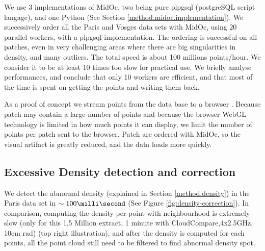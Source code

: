 		
		We use 3 implementations of MidOc, two being pure plpgsql (postgreSQL script langage), and one Python (See Section \ref{method.midoc.implementation}).
		We successively order all the Paris and Vosges data sets with MidOc, using 20 parallel workers, with a plpgsql implementation.
		The ordering is successful on all patches, even in very challenging areas where there are big singularities in density, and many outliers.
		The total speed is about 100 millions points/hour.
		We consider it to be at least 10 times too slow for practical use.
		We briefly analyse performances, and conclude that only 10 workers are efficient, and that most of the time is spent on getting the points and writing them back.
		
		 
		As a proof of concept we stream points from the data base to a browser \cite{IGN2014a}. Because patch may contain a large number of points and because the browser WebGL technology is limited in how much points it can display,
		we limit the number of points per patch sent to the browser. Patch are ordered with MidOc, so the visual artifact is greatly reduced, and the data loads more quickly. 


	\subsection{Excessive Density detection and correction} 
		
		We detect the abnormal density (explained in Section \ref{method.density}) in the Paris data set in $\sim 100 \milli \second$ 
		(See Figure \ref{fig:density-correction}). 
		In comparison, computing the density per point with neighbourhood is extremely slow (only for this 1.5 Million extract, 1 minute with CloudCompare,4x2.5GHz, 10cm rad) (top right illustration), and after the density is computed for each points, all the point cloud still need to be filtered to find abnormal density spot.
		
